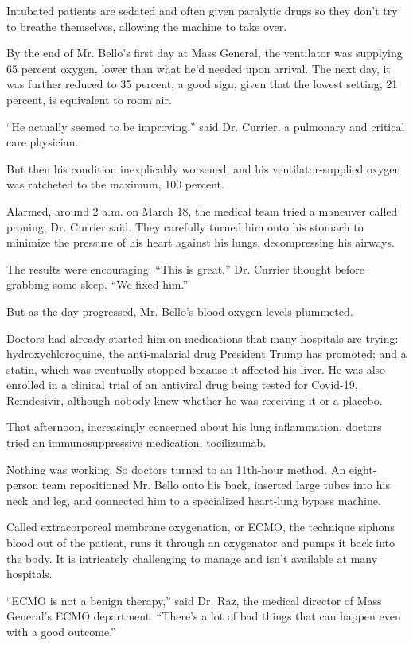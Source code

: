 Intubated patients are sedated and often given paralytic drugs so they
don't try to breathe themselves, allowing the machine to take over.

By the end of Mr. Bello's first day at Mass General, the ventilator was
supplying 65 percent oxygen, lower than what he'd needed upon arrival.
The next day, it was further reduced to 35 percent, a good sign, given
that the lowest setting, 21 percent, is equivalent to room air.

``He actually seemed to be improving,'' said Dr. Currier, a pulmonary
and critical care physician.

But then his condition inexplicably worsened, and his
ventilator-supplied oxygen was ratcheted to the maximum, 100 percent.

Alarmed, around 2 a.m. on March 18, the medical team tried a maneuver
called proning, Dr. Currier said. They carefully turned him onto his
stomach to minimize the pressure of his heart against his lungs,
decompressing his airways.

The results were encouraging. ``This is great,'' Dr. Currier thought
before grabbing some sleep. ``We fixed him.''

But as the day progressed, Mr. Bello's blood oxygen levels plummeted.

Doctors had already started him on medications that many hospitals are
trying: hydroxychloroquine, the anti-malarial drug President Trump has
promoted; and a statin, which was eventually stopped because it affected
his liver. He was also enrolled in a clinical trial of an antiviral drug
being tested for Covid-19, Remdesivir, although nobody knew whether he
was receiving it or a placebo.

That afternoon, increasingly concerned about his lung inflammation,
doctors tried an immunosuppressive medication, tocilizumab.

Nothing was working. So doctors turned to an 11th-hour method. An
eight-person team repositioned Mr. Bello onto his back, inserted large
tubes into his neck and leg, and connected him to a specialized
heart-lung bypass machine.

Called extracorporeal membrane oxygenation, or ECMO, the technique
siphons blood out of the patient, runs it through an oxygenator and
pumps it back into the body. It is intricately challenging to manage and
isn't available at many hospitals.

``ECMO is not a benign therapy,'' said Dr. Raz, the medical director of
Mass General's ECMO department. ``There's a lot of bad things that can
happen even with a good outcome.''

